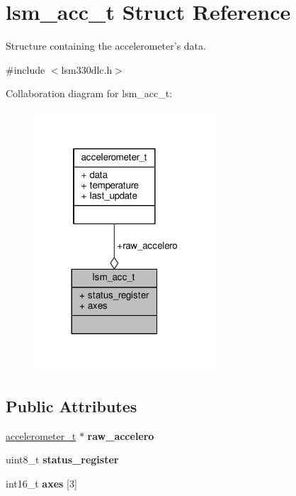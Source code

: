 \hypertarget{structlsm__acc__t}{\section{lsm\+\_\+acc\+\_\+t Struct Reference}
\label{structlsm__acc__t}
}


Structure containing the accelerometer's data.  




{\ttfamily \#include $<$lsm330dlc.\+h$>$}



Collaboration diagram for lsm\+\_\+acc\+\_\+t\+:
\nopagebreak
\begin{figure}[H]
\begin{center}
\leavevmode
\includegraphics[width=192pt]{structlsm__acc__t__coll__graph}
\end{center}
\end{figure}
\subsection*{Public Attributes}
\begin{DoxyCompactItemize}
\item 
\hypertarget{structlsm__acc__t_a0d67fcc96d381c81f778e42c51335d16}{\hyperlink{structaccelerometer__t}{accelerometer\+\_\+t} $\ast$ {\bfseries raw\+\_\+accelero}}\label{structlsm__acc__t_a0d67fcc96d381c81f778e42c51335d16}

\item 
\hypertarget{structlsm__acc__t_aa214db679abd20eeb3b29897a9019128}{uint8\+\_\+t {\bfseries status\+\_\+register}}\label{structlsm__acc__t_aa214db679abd20eeb3b29897a9019128}

\item 
\hypertarget{structlsm__acc__t_a66b5ee506b2d304120208a3311744417}{int16\+\_\+t {\bfseries axes} \mbox{[}3\mbox{]}}\label{structlsm__acc__t_a66b5ee506b2d304120208a3311744417}

\end{DoxyCompactItemize}


